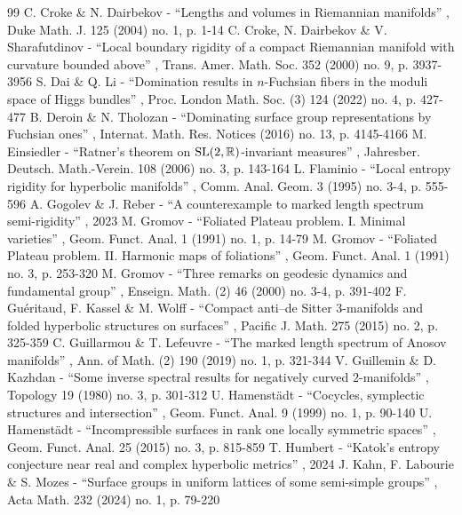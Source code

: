 \documentclass[10pt]{amsart}
\theoremstyle{plain}
\theoremstyle{definition}
\begin{document}
\begin{thebibliography}{99}
 C. Croke \& N. Dairbekov - “Lengths and volumes in Riemannian manifolds” , Duke Math. J. 125 (2004) no. 1, p. 1-14
 C. Croke, N. Dairbekov \& V. Sharafutdinov - “Local boundary rigidity of a compact Riemannian manifold with curvature bounded above” , Trans. Amer. Math. Soc. 352 (2000) no. 9, p. 3937-3956
 S. Dai \& Q. Li - “Domination results in $n$-Fuchsian fibers in the moduli space of Higgs bundles” , Proc. London Math. Soc. (3) 124 (2022) no. 4, p. 427-477
 B. Deroin \& N. Tholozan - “Dominating surface group representations by Fuchsian ones” , Internat. Math. Res. Notices (2016) no. 13, p. 4145-4166
 M. Einsiedler - “Ratner’s theorem on ${\rm SL}(2,\mathbb{R})$-invariant measures” , Jahresber. Deutsch. Math.-Verein. 108 (2006) no. 3, p. 143-164
 L. Flaminio - “Local entropy rigidity for hyperbolic manifolds” , Comm. Anal. Geom. 3 (1995) no. 3-4, p. 555-596
 A. Gogolev \& J. Reber - “A counterexample to marked length spectrum semi-rigidity” , 2023
 M. Gromov - “Foliated Plateau problem. I. Minimal varieties” , Geom. Funct. Anal. 1 (1991) no. 1, p. 14-79
 M. Gromov - “Foliated Plateau problem. II. Harmonic maps of foliations” , Geom. Funct. Anal. 1 (1991) no. 3, p. 253-320
 M. Gromov - “Three remarks on geodesic dynamics and fundamental group” , Enseign. Math. (2) 46 (2000) no. 3-4, p. 391-402
 F. Guéritaud, F. Kassel \& M. Wolff - “Compact anti–de Sitter 3-manifolds and folded hyperbolic structures on surfaces” , Pacific J. Math. 275 (2015) no. 2, p. 325-359
 C. Guillarmou \& T. Lefeuvre - “The marked length spectrum of Anosov manifolds” , Ann. of Math. (2) 190 (2019) no. 1, p. 321-344
 V. Guillemin \& D. Kazhdan - “Some inverse spectral results for negatively curved $2$-manifolds” , Topology 19 (1980) no. 3, p. 301-312
 U. Hamenstädt - “Cocycles, symplectic structures and intersection” , Geom. Funct. Anal. 9 (1999) no. 1, p. 90-140
 U. Hamenstädt - “Incompressible surfaces in rank one locally symmetric spaces” , Geom. Funct. Anal. 25 (2015) no. 3, p. 815-859
 T. Humbert - “Katok’s entropy conjecture near real and complex hyperbolic metrics” , 2024
 J. Kahn, F. Labourie \& S. Mozes - “Surface groups in uniform lattices of some semi-simple groups” , Acta Math. 232 (2024) no. 1, p. 79-220

\end{thebibliography}
\end{document}
